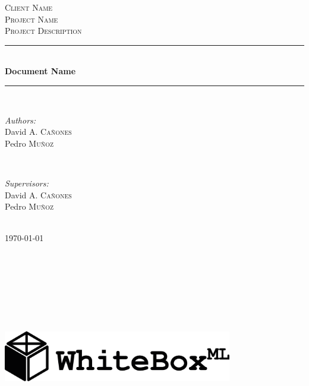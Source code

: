 \documentclass[12pt]{article}
\begin{document}

\begin{titlepage}
	
\newcommand{\HRule}{\rule{\linewidth}{0.5mm}}

\center

\textsc{\LARGE Client Name}\\[1.5cm]
\textsc{\Large Project Name}\\[0.5cm]
\textsc{\large Project Description}\\[0.5cm]

\HRule \\[0.4cm]
{ \huge \bfseries Document Name}\\[0.0cm]
\HRule \\[1.5cm]

\begin{minipage}{0.4\textwidth}
	\begin{flushleft} \large
		\emph{Authors:}\\
		David A. \textsc{Cañones}\\
		Pedro \textsc{Muñoz}
	\end{flushleft}
\end{minipage}
~
\begin{minipage}{0.4\textwidth}
	\begin{flushright} \large
		\emph{Supervisors:} \\
		David A. \textsc{Cañones}\\
		Pedro \textsc{Muñoz}
	\end{flushright}
\end{minipage}\\[4cm]

{\large \today}\\[3cm]

\includegraphics[width=10cm,height=10cm,keepaspectratio]{logo.png}\\[1cm]

\vfill

\end{titlepage}
\end{document}
